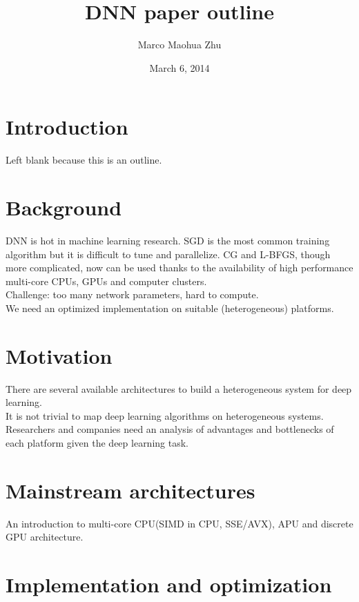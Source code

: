 \def\CTeXPreproc{Created by ctex v0.2.14, don't edit!}

\title{DNN paper outline}
\author{Marco Maohua Zhu}
\date{March 6, 2014}

\maketitle
\acmblank{}



\section{Introduction}

Left blank because this is an outline.

\section{Background}

DNN is hot in machine learning research. SGD is the most common training algorithm but it is difficult to tune and parallelize. CG and L-BFGS, though more complicated, now can be used thanks to the availability of high performance multi-core CPUs, GPUs and computer clusters.\\
Challenge: too many network parameters, hard to compute.\\
We need an optimized implementation on suitable (heterogeneous) platforms.

\section{Motivation}

There are several available architectures to build a heterogeneous system for deep learning.\\
It is not trivial to map deep learning algorithms on heterogeneous systems.\\
Researchers and companies need an analysis of advantages and bottlenecks of each platform given the deep learning task.

\section{Mainstream architectures}

An introduction to multi-core CPU(SIMD in CPU, SSE/AVX), APU and discrete GPU architecture.

\section{Implementation and optimization}

